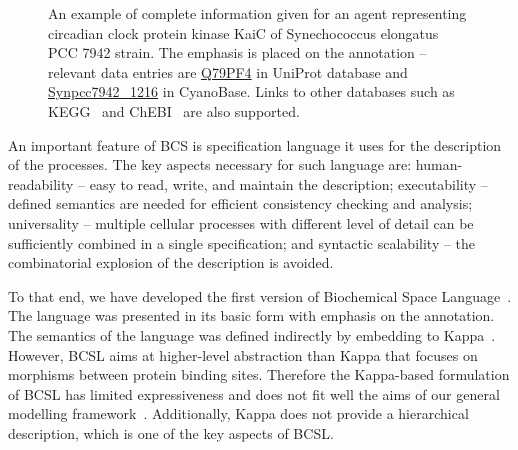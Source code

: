 \documentclass[11pt,a4paper]{report}
\begin{document}
\begin{figure}[!h]
  \begin{center}
  \end{center}
  \caption{An example of complete information given for an agent representing circadian clock protein kinase KaiC of Synechococcus elongatus PCC 7942 strain. The emphasis is placed on the annotation -- relevant data entries are \href{https://www.uniprot.org/uniprot/Q79PF4}{Q79PF4} in UniProt database and \href{http://genome.microbedb.jp/cyanobase/GCA_000012525.1/genes/Synpcc7942_1216}{Synpcc7942\_1216} in CyanoBase. Links to other databases such as KEGG~\cite{KEGG} and ChEBI~\cite{ChEBI} are also supported.}\label{entity_example}
\end{figure}

An important feature of BCS is specification language it uses for the description of the processes. The key aspects necessary for such language are: human-readability -- easy to read, write, and maintain the description; executability -- defined semantics are needed for efficient consistency checking and analysis; universality -- multiple cellular processes with different level of detail can be sufficiently combined in a single specification; and syntactic scalability -- the combinatorial explosion of the description is avoided.

To that end, we have developed the first version of Biochemical Space Language~\cite{dved2016formal}. The language was presented in its basic form with emphasis on the annotation. The semantics of the language was defined indirectly by embedding to Kappa~\cite{kappa_formal}. However, BCSL aims at higher-level abstraction than Kappa that focuses on morphisms between protein binding sites. Therefore the Kappa-based formulation of BCSL has limited expressiveness and does not fit well the aims of our general modelling framework~\cite{klement2013comprehensive}. Additionally, Kappa does not provide a hierarchical description, which is one of the key aspects of BCSL.
\end{document}
